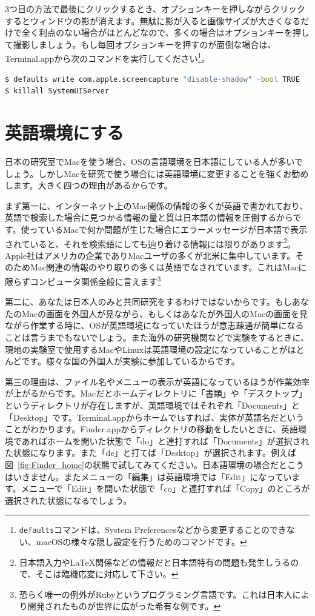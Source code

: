 3つ目の方法で最後にクリックするとき、オプションキーを押しながらクリックするとウィンドウの影が消えます。無駄に影が入ると画像サイズが大きくなるだけで全く利点のない場合がほとんどなので、多くの場合はオプションキーを押して撮影しましょう。もし毎回オプションキーを押すのが面倒な場合は、Terminal.appから次のコマンドを実行してください\footnote{\texttt{defaults}コマンドは、System Preferencesなどから変更することのできない、macOSの様々な隠し設定を行うためのコマンドです。}。

\begin{lstlisting}[language=bash]
$ defaults write com.apple.screencapture "disable-shadow" -bool TRUE
$ killall SystemUIServer 
\end{lstlisting}

\section{英語環境にする}
日本の研究室でMacを使う場合、OSの言語環境を日本語にしている人が多いでしょう。しかしMacを研究で使う場合には英語環境に変更することを強くお勧めします。大きく四つの理由があるからです。

まず第一に、インターネット上のMac関係の情報の多くが英語で書かれており、英語で検索した場合に見つかる情報の量と質は日本語の情報を圧倒するからです。使っているMacで何か問題が生じた場合にエラーメッセージが日本語で表示されていると、それを検索語にしても辿り着ける情報には限りがあります\footnote{日本語入力や\LaTeX 関係などの情報だと日本語特有の問題も発生しうるので、そこは臨機応変に対応して下さい。}。Apple社はアメリカの企業でありMacユーザの多くが北米に集中しています。そのためMac関連の情報のやり取りの多くは英語でなされています。これはMacに限らずコンピュータ関係全般に言えます\footnote{恐らく唯一の例外がRubyというプログラミング言語です。これは日本人により開発されたものが世界に広がった希有な例です。}

第二に、あなたは日本人のみと共同研究をするわけではないからです。もしあなたのMacの画面を外国人が見ながら、もしくはあなたが外国人のMacの画面を見ながら作業する時に、OSが英語環境になっていたほうが意志疎通が簡単になることは言うまでもないでしょう。また海外の研究機関などで実験をするときに、現地の実験室で使用するMacやLinuxは英語環境の設定になっていることがほとんどです。様々な国の外国人が実験に参加しているからです。

第三の理由は、ファイル名やメニューの表示が英語になっているほうが作業効率が上がるからです。Macだとホームディレクトリに「書類」や「デスクトップ」というディレクトリが存在しますが、英語環境ではそれぞれ「Documents」と「Desktop」です。Terminal.appからホームで\texttt{ls}すれば、実体が英語名だということがわかります。Finder.appからディレクトリの移動をしたいときに、英語環境であればホームを開いた状態で「do」と連打すれば「Documents」が選択された状態になります。また「de」と打てば「Desktop」が選択されます。例えば図~\ref{fig:Finder_home}の状態で試してみてください。日本語環境の場合だとこうはいきません。またメニューの「編集」は英語環境では「Edit」になっています。メニューで「Edit」を開いた状態で「co」と連打すれば「Copy」のところが選択された状態になるでしょう。

